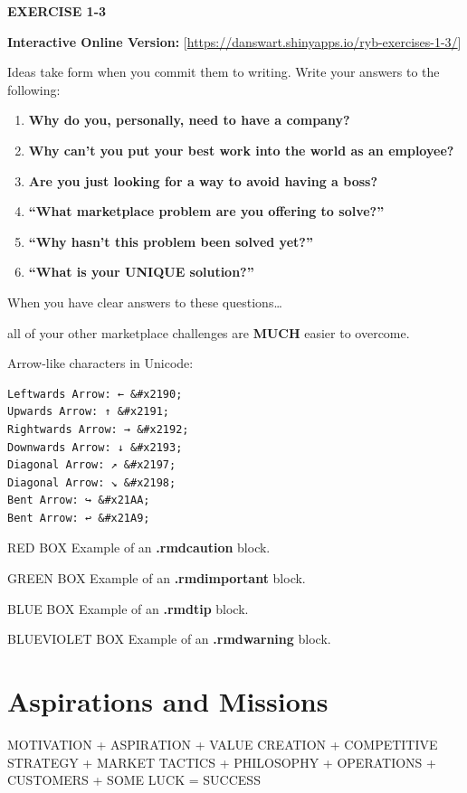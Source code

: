 \documentclass[
]{book}
\begin{document}
\textbf{EXERCISE 1-3}

{\textbf{Interactive Online Version:}} {[}\url{https://danswart.shinyapps.io/ryb-exercises-1-3/}{]}

Ideas take form when you commit them to writing. Write your answers to the following:

\begin{enumerate}
\def\labelenumi{\arabic{enumi}.}
\item
  \textbf{Why do you, personally, need to have a company?}
\item
  \textbf{Why can't you put your best work into the world as an employee?}
\item
  \textbf{Are you just looking for a way to avoid having a boss?}
\item
  \textbf{``What marketplace problem are you offering to solve?''}
\item
  \textbf{``Why hasn't this problem been solved yet?''}
\item
  \textbf{``What is your UNIQUE solution?''}
\end{enumerate}

When you have clear answers to these questions\ldots{}

{all of your other marketplace challenges are \textbf{MUCH} easier to overcome.}

Arrow-like characters in Unicode:

\begin{verbatim}
Leftwards Arrow: ← &#x2190;
Upwards Arrow: ↑ &#x2191;
Rightwards Arrow: → &#x2192;
Downwards Arrow: ↓ &#x2193;
Diagonal Arrow: ↗ &#x2197;
Diagonal Arrow: ↘ &#x2198;
Bent Arrow: ↪ &#x21AA;
Bent Arrow: ↩ &#x21A9;
\end{verbatim}

RED BOX Example of an \textbf{.rmdcaution} block.

GREEN BOX Example of an \textbf{.rmdimportant} block.

BLUE BOX Example of an \textbf{.rmdtip} block.

BLUEVIOLET BOX Example of an \textbf{.rmdwarning} block.

\hypertarget{aspirations-and-missions}{%
\chapter{Aspirations and Missions}\label{aspirations-and-missions}}

{MOTIVATION}
{+}
{ASPIRATION}
{+}
{VALUE CREATION}
{+}
{COMPETITIVE STRATEGY }
{+}
{MARKET TACTICS}
{+}
{PHILOSOPHY}
{+}
{OPERATIONS}
{+}
{CUSTOMERS}
{+}
{SOME LUCK}
{=}
{SUCCESS}
\end{document}
